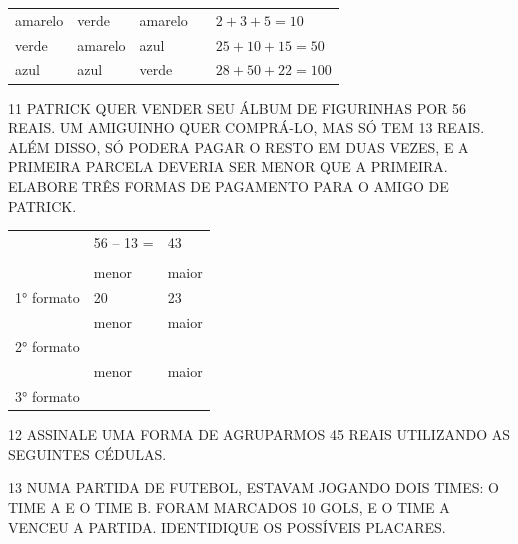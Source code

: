 
\begin{longtable}[]{@{}lllll@{}}
\toprule
amarelo & verde & amarelo & & \(2 + 3 + 5 = 10\)\tabularnewline
verde & amarelo & azul & & \(25 + 10 + 15 = 50\)\tabularnewline
azul & azul & verde & & \(28 + 50 + 22 = 100\)\tabularnewline
\bottomrule
\end{longtable}

\num{11} PATRICK QUER VENDER SEU ÁLBUM DE FIGURINHAS POR 56 REAIS. UM AMIGUINHO
QUER COMPRÁ-LO, MAS SÓ TEM 13 REAIS. ALÉM DISSO, SÓ PODERA PAGAR O RESTO
EM DUAS VEZES, E A PRIMEIRA PARCELA DEVERIA SER MENOR QUE A PRIMEIRA.
ELABORE TRÊS FORMAS DE PAGAMENTO PARA O AMIGO DE PATRICK.

\begin{longtable}[]{@{}lll@{}}
\toprule
& 56 -- 13 = & 43\tabularnewline
& &\tabularnewline
& menor & maior\tabularnewline
1° formato & 20 & 23\tabularnewline
& menor & maior\tabularnewline
2° formato & &\tabularnewline
& menor & maior\tabularnewline
3° formato & &\tabularnewline
\bottomrule
\end{longtable}


\num{12} ASSINALE UMA FORMA DE AGRUPARMOS 45 REAIS UTILIZANDO AS SEGUINTES
CÉDULAS.




\num{13} NUMA PARTIDA DE FUTEBOL, ESTAVAM JOGANDO DOIS TIMES: O TIME A E O TIME B. FORAM MARCADOS 10 GOLS, E O TIME A VENCEU A PARTIDA. IDENTIDIQUE OS POSSÍVEIS PLACARES.

